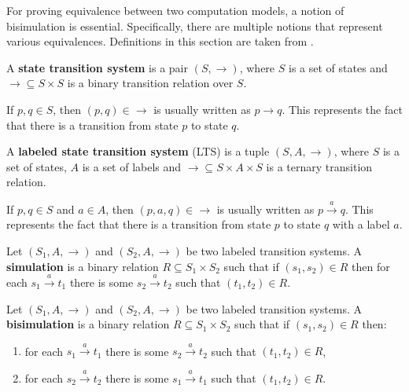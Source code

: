 For proving equivalence between two computation models, a notion of  bisimulation is essential. Specifically, there are multiple notions that represent various equivalences. Definitions in this section are taken from \cite{DeNicola95Bisimulations}.
\begin{definition}
  A  {\bf state transition system} is a pair $(S, \rightarrow)$, where $S$ is a set of states and $\rightarrow\subseteq S\times S$ is a binary transition relation over $S$.
\end{definition}
  If $p,q\in S$, then $(p,q)\in \rightarrow$ is usually written as $p\rightarrow q$. This represents the fact that there is a transition from state $p$ to state $q$.

\begin{definition}
  A  {\bf labeled state transition system} (LTS) is a tuple $(S, A, \rightarrow)$, where $S$ is a set of states, $A$ is a set of labels and $\rightarrow\subseteq S\times A\times S$ is a ternary transition relation.
\end{definition}

If $p,q\in S$ and $a\in A$, then $(p,a,q)\in \rightarrow$ is usually written as $p\xrightarrow{a} q$. This represents the fact that there is a transition from state $p$ to state $q$ with a label $a$.

\begin{definition}
  Let $(S_1, A, \rightarrow)$ and $(S_2, A, \rightarrow)$ be two labeled transition systems.
  A  {\bf simulation} is a binary relation $R\subseteq S_1\times S_2$ such that if $(s_1,s_2)\in R$ then for each $s_1\xrightarrow{a} t_1$ there is some $s_2\xrightarrow{a} t_2$ such that $(t_1, t_2)\in R$.
\end{definition}

\begin{definition}
  Let $(S_1, A, \rightarrow)$ and $(S_2, A, \rightarrow)$ be two labeled transition systems.
  A  {\bf bisimulation} is a binary relation $R\subseteq S_1\times S_2$ such that if $(s_1,s_2)\in R$ then:
  \begin{enumerate}
    \item for each $s_1\xrightarrow{a} t_1$ there is some $s_2\xrightarrow{a} t_2$ such that $(t_1, t_2)\in R$,
    \item for each $s_2\xrightarrow{a} t_2$ there is some $s_1\xrightarrow{a} t_1$ such that $(t_1, t_2)\in R$.
  \end{enumerate}
\end{definition}

